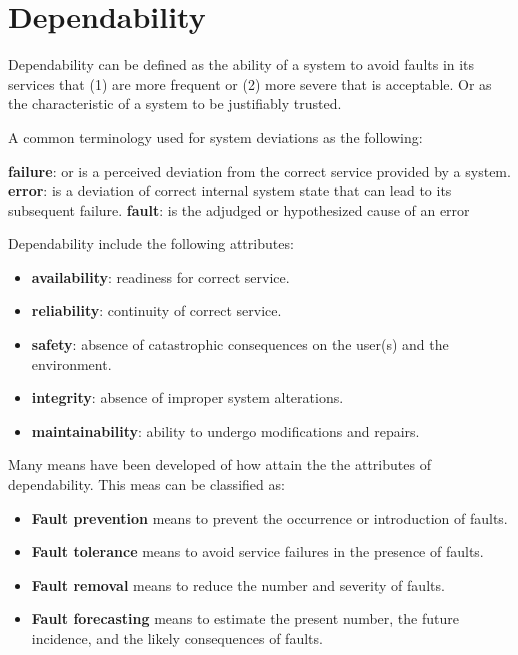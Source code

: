 \section{Dependability}
Dependability can be defined as the ability of a system to avoid faults in its services
that (1) are more frequent or (2) more severe that is acceptable. Or as the characteristic of a system to be justifiably trusted.

A common terminology used for system deviations as the following: \cite{avizienis_basic_2004}

\begin{itemize}
  \textbf{failure}: or  is a perceived deviation from the correct service provided by a system.
  \textbf{error}: is a deviation of correct internal system state that can lead to its subsequent failure.
  \textbf{fault}: is the adjudged or
hypothesized cause of an error
\end{itemize}

Dependability include the following attributes:\cite{avizienis_basic_2004}
\begin{itemize}
  \item \textbf{availability}: readiness for correct service.
  \item \textbf{reliability}: continuity of correct service.
  \item \textbf{safety}: absence of catastrophic consequences on the
user(s) and the environment.
  \item \textbf{integrity}: absence of improper system alterations.
  \item \textbf{maintainability}: ability to undergo modifications and repairs.
\end{itemize}


Many means have been developed of how attain the the attributes of dependability. This meas can be classified as:

\begin{itemize}
  \item \textbf{Fault prevention} means to prevent the occurrence or introduction of faults.
  \item \textbf{Fault tolerance} means to avoid service failures in the presence of faults.
  \item \textbf{Fault removal} means to reduce the number and severity of faults.
  \item \textbf{Fault forecasting} means to estimate the present number, the future incidence, and the likely consequences of faults.
\end{itemize}


